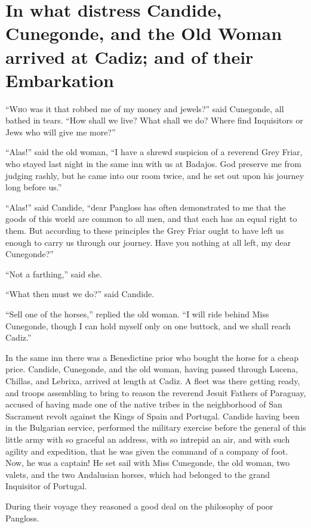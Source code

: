 \chapter{In what distress Candide, Cunegonde, and the Old Woman arrived at Cadiz; and of their Embarkation}
\lettrine[lraise=0.1,nindent=0em,slope=-.5em]{``W}{ho} was it that robbed me of my money and jewels?'' said Cunegonde, all bathed in tears. ``How shall we live? What shall we do? Where find Inquisitors or Jews who will give me more?''

``Alas!'' said the old woman, ``I have a shrewd suspicion of a reverend Grey Friar, who stayed last night in the same inn with us at Badajos. God preserve me from judging rashly, but he came into our room twice, and he set out upon his journey long before us.''

``Alas!'' said Candide, ``dear Pangloss has often demonstrated to me that the goods of this world are common to all men, and that each has an equal right to them. But according to these principles the Grey Friar ought to have left us enough to carry us through our journey. Have you nothing at all left, my dear Cunegonde?''

``Not a farthing,'' said she.

``What then must we do?'' said Candide.

``Sell one of the horses,'' replied the old woman. ``I will ride behind Miss Cunegonde, though I can hold myself only on one buttock, and we shall reach Cadiz.''

In the same inn there was a Benedictine prior who bought the horse for a cheap price. Candide, Cunegonde, and the old woman, having passed through Lucena, Chillas, and Lebrixa, arrived at length at Cadiz. A fleet was there getting ready, and troops assembling to bring to reason the reverend Jesuit Fathers of Paraguay, accused of having made one of the native tribes in the neighborhood of San Sacrament revolt against the Kings of Spain and Portugal. Candide having been in the Bulgarian service, performed the military exercise before the general of this little army with so graceful an address, with so intrepid an air, and with such agility and expedition, that he was given the command of a company of foot. Now, he was a captain! He set sail with Miss Cunegonde, the old woman, two valets, and the two Andalusian horses, which had belonged to the grand Inquisitor of Portugal.

During their voyage they reasoned a good deal on the philosophy of poor Pangloss.

